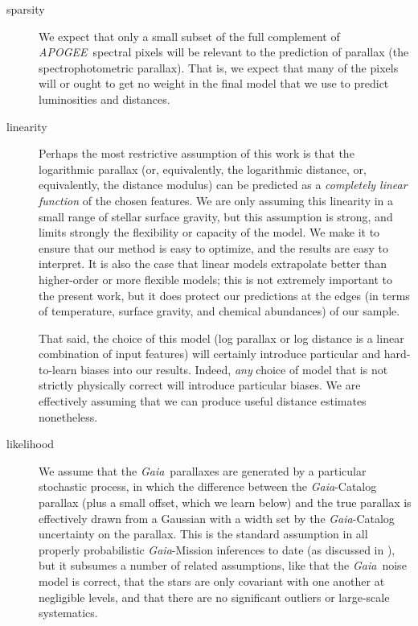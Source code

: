 \documentclass[modern]{aastex62}
\newcommand{\acronym}[1]{{\small{#1}}}
\newcommand{\project}[1]{\textsl{#1}}
\newcommand{\apogee}{\project{\acronym{APOGEE}}}
\newcommand{\gaia}{\project{Gaia}}
\begin{document}
\begin{description}
\item[sparsity] We expect that only a small subset of the full complement of
\apogee\ spectral pixels will be relevant to the prediction of parallax
(the spectrophotometric parallax).
That is, we expect that many of the pixels will or ought to get no weight in the
final model that we use to predict luminosities and distances.

\item[linearity] Perhaps the most restrictive assumption of this work is that
the logarithmic parallax (or, equivalently, the logarithmic distance, or,
equivalently, the distance modulus) 
can be predicted as a \emph{completely linear function} of
the chosen features. We are only assuming this linearity in a small range of stellar
surface gravity, but this assumption is strong, and limits strongly the
flexibility or capacity of the model.
We make it to ensure that our method is easy to optimize, and the results are easy
to interpret.
It is also the case that linear models extrapolate better than higher-order or more
flexible models; this is not extremely important to the present work, but it does
protect our predictions at the edges (in terms of temperature, surface gravity,
and chemical abundances) of our sample.

That said, the choice of this model (log parallax or log distance is a
linear combination of input features) will certainly introduce
particular and hard-to-learn biases into our results.
Indeed, \emph{any} choice of model that is not strictly physically
correct will introduce particular biases.
We are effectively assuming that we can produce useful distance
estimates nonetheless.

\item[likelihood] We assume that the \gaia\ parallaxes are generated by a particular
stochastic process, in which the difference between the \gaia-Catalog parallax (plus
a small offset, which we learn below) and the true parallax is effectively drawn from a
Gaussian with a width set by the \gaia-Catalog uncertainty on the parallax.
This is the standard assumption in all properly probabilistic
\gaia-Mission inferences to date (as discussed in \citealt{gaialf}),
but it subsumes a number of related assumptions, like that the
\gaia\ noise model is correct, that the stars are only covariant with
one another at negligible levels, and that there are no significant
outliers or large-scale systematics.
\end{description}
\end{document}
